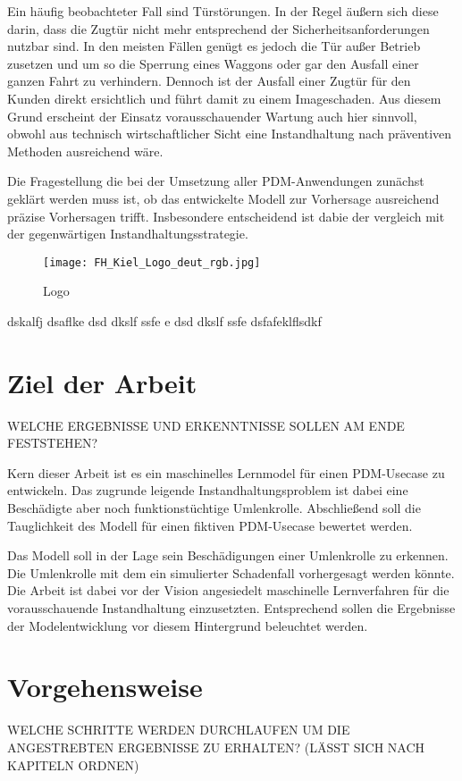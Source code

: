 Ein häufig beobachteter Fall sind Türstörungen. In der Regel äußern sich diese darin, dass die Zugtür nicht mehr entsprechend der Sicherheitsanforderungen nutzbar sind. In den meisten Fällen genügt es jedoch die Tür außer Betrieb zusetzen und um so die Sperrung eines Waggons oder gar den Ausfall einer ganzen Fahrt zu verhindern. Dennoch ist der Ausfall einer Zugtür für den Kunden direkt ersichtlich und führt damit zu einem Imageschaden. Aus diesem Grund erscheint der Einsatz vorausschauender Wartung auch hier sinnvoll, obwohl aus technisch wirtschaftlicher Sicht eine Instandhaltung nach präventiven Methoden ausreichend wäre. 

Die Fragestellung die bei der Umsetzung aller PDM-Anwendungen zunächst geklärt werden muss ist, ob das entwickelte Modell zur Vorhersage ausreichend präzise Vorhersagen trifft. Insbesondere entscheidend ist dabie der vergleich mit der gegenwärtigen Instandhaltungsstrategie.

\begin{figure}[ht]
	\centering
	\texttt{[image: FH\_Kiel\_Logo\_deut\_rgb.jpg]}
	\caption{Logo}
	\label{fig:fhlogo}
\end{figure}

dskalfj dsaflke dsd dkslf ssfe e dsd dkslf ssfe dsfafeklflsdkf
\section{Ziel der Arbeit}
\label{sec:ziel}
WELCHE ERGEBNISSE UND ERKENNTNISSE SOLLEN AM ENDE FESTSTEHEN?

Kern dieser Arbeit ist es ein maschinelles Lernmodel für einen PDM-Usecase zu entwickeln. Das zugrunde leigende Instandhaltungsproblem ist dabei eine Beschädigte aber noch funktionstüchtige Umlenkrolle. Abschließend soll die Tauglichkeit des Modell für einen fiktiven PDM-Usecase bewertet werden. 



Das Modell soll in der Lage sein Beschädigungen einer Umlenkrolle zu erkennen. Die Umlenkrolle mit dem ein simulierter Schadenfall vorhergesagt werden könnte. Die Arbeit ist dabei vor der Vision angesiedelt maschinelle Lernverfahren für die vorausschauende Instandhaltung einzusetzten. Entsprechend sollen die Ergebnisse der Modelentwicklung vor diesem Hintergrund beleuchtet werden.

\section{Vorgehensweise}
\label{sec:vorgehensweise}
WELCHE SCHRITTE WERDEN DURCHLAUFEN UM DIE ANGESTREBTEN ERGEBNISSE ZU ERHALTEN?
(LÄSST SICH NACH KAPITELN ORDNEN)

